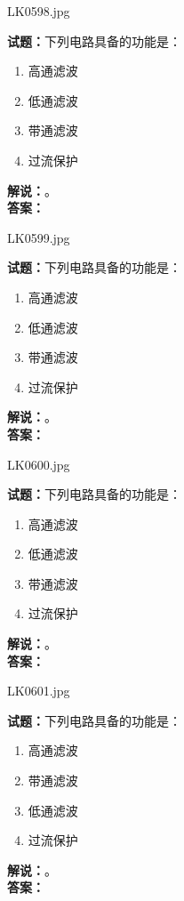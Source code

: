\documentclass{ctexbook}
\begin{document}
\vspace{\baselineskip}

LK0598.jpg

\noindent\textbf{试题：}下列电路具备的功能是：
\begin{enumerate}[leftmargin=3em]
  \item 高通滤波
  \item 低通滤波
  \item 带通滤波
  \item 过流保护
\end{enumerate}
\noindent\textbf{解说：}\textbf{}。\\\noindent\textbf{答案：}

\vspace{\baselineskip}

LK0599.jpg

\noindent\textbf{试题：}下列电路具备的功能是：
\begin{enumerate}[leftmargin=3em]
  \item 高通滤波
  \item 低通滤波
  \item 带通滤波
  \item 过流保护
\end{enumerate}
\noindent\textbf{解说：}\textbf{}。\\\noindent\textbf{答案：}

\vspace{\baselineskip}

LK0600.jpg

\noindent\textbf{试题：}下列电路具备的功能是：
\begin{enumerate}[leftmargin=3em]
  \item 高通滤波
  \item 低通滤波
  \item 带通滤波
  \item 过流保护
\end{enumerate}
\noindent\textbf{解说：}\textbf{}。\\\noindent\textbf{答案：}

\vspace{\baselineskip}

LK0601.jpg

\noindent\textbf{试题：}下列电路具备的功能是：
\begin{enumerate}[leftmargin=3em]
  \item 高通滤波
  \item 带通滤波
  \item 低通滤波
  \item 过流保护
\end{enumerate}
\noindent\textbf{解说：}\textbf{}。\\\noindent\textbf{答案：}
\end{document}
